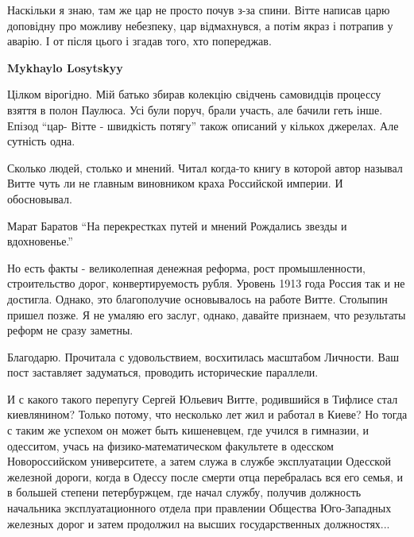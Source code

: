 \begin{itemize}

Наскільки я знаю, там же цар не просто почув з-за спини. Вітте написав царю
доповідну про можливу небезпеку, цар відмахнувся, а потім якраз і потрапив у
аварію. І от після цього і згадав того, хто попереджав.

\begin{itemize} %
\textbf{Mykhaylo Losytskyy} 

Цілком вірогідно. Мій батько збирав колекцію свідчень самовидців процессу
взяття в полон Паулюса. Усі були поруч, брали участь, але бачили геть інше.
Епізод \enquote{цар- Вітте - швидкість потягу} також описаний у кількох джерелах. Але
сутність одна.

\end{itemize} %


Сколько людей, столько и мнений. Читал когда-то книгу в которой автор называл
Витте чуть ли не главным виновником краха Российской империи. И обосновывал.

\begin{itemize} %

Марат Баратов \enquote{На перекрестках путей и мнений
Рождались звезды и вдохновенье.}

Но есть факты - великолепная денежная реформа, рост промышленности,
строительство дорог, конвертируемость рубля. Уровень 1913 года Россия так и не
достигла. Однако, это благополучие основывалось на работе Витте. Столыпин
пришел позже. Я не умаляю его заслуг, однако, давайте признаем, что результаты
реформ не сразу заметны.

\end{itemize} %


Благодарю. Прочитала с удовольствием, восхитилась масштабом Личности. Ваш пост
заставляет задуматься, проводить исторические параллели.



И с какого такого перепугу Сергей Юльевич Витте, родившийся в Тифлисе стал
киевлянином? Только потому, что несколько лет жил и работал в Киеве? Но тогда с
таким же успехом он может быть кишеневцем, где учился в гимназии, и одесситом,
учась на физико-математическом факультете в одесском Новороссийском
университете, а затем служа в службе эксплуатации Одесской железной дороги,
когда в Одессу после смерти отца перебралась вся его семья, и в большей степени
петербуржцем, где начал службу, получив должность начальника эксплуатационного
отдела при правлении Общества Юго-Западных железных дорог и затем продолжил на
высших государственных должностях...


\end{itemize}

